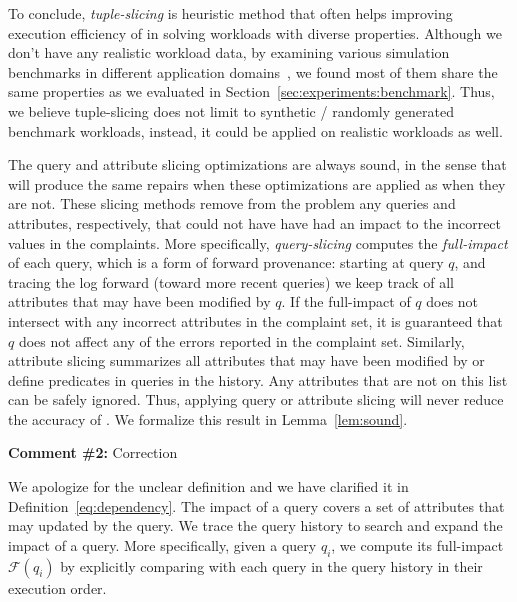 To conclude, \emph{tuple-slicing} is heuristic method that often helps   
improving execution efficiency of \sys in solving workloads with diverse properties. 
Although we don't have any realistic workload data, by examining various  
simulation benchmarks in different application domains~\cite{oltpbench}, we found most of them
share the same properties as we evaluated in Section~\ref{sec:experiments:benchmark}. 
Thus, we believe tuple-slicing does not limit to synthetic / randomly
generated benchmark workloads, instead, it could be applied on realistic workloads as well. 



The query and attribute slicing optimizations are always sound, in the sense
that \sys will produce the same repairs when these optimizations are applied
as when they are not. These slicing methods remove from the problem any
queries and attributes, respectively, that could not have have had an impact
to the incorrect values in the complaints. More specifically,
\emph{query-slicing} computes the \emph{full-impact} of each query, which is a
form of forward provenance: starting at query $q$, and tracing the log forward
(toward more recent queries) we keep track of all attributes that may have
been modified by $q$. If the full-impact of $q$ does not intersect with any
incorrect attributes in the complaint set, it is guaranteed that $q$ does not
affect any of the errors reported in the complaint set. Similarly, attribute
slicing summarizes all attributes that may have been modified by or define
predicates in queries in the history. Any attributes that are not on this list
can be safely ignored. Thus, applying query or attribute slicing will never
reduce the accuracy of \sys. We formalize this result in
Lemma~\ref{lem:sound}.




\comskip

\noindent
\textbf{Comment \#2:} Correction
\begin{quote}
\end{quote}


We apologize for the unclear definition and we have clarified it in Definition~\ref{eq:dependency}.
The impact of a query covers a set of attributes that may updated by 
the query. We trace the query 
history to search and expand the impact of a query. More specifically, given a query 
$q_i$, we compute its full-impact $\mathcal{F}(q_i)$ by explicitly 
comparing with each query in the query history in their execution order. 

